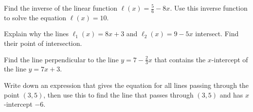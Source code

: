 \documentclass[11pt,letterpaper]{article}
\begin{document}

 Find the inverse of the linear function $\ell(x)= \frac{5}{6} - 8x$. Use this inverse function to solve the equation $\ell(x)= 10$. 



\newpage



 Explain why the lines $\ell_1(x)= 8x + 3$ and $\ell_2(x)= 9 - 5x$ intersect. Find their point of intersection. 



\newpage

 

 Find the line perpendicular to the line $y= 7 - \frac{2}{3}x$ that contains the $x$-intercept of the line $y= 7x + 3$. 



\newpage



 Write down an expression that gives the equation for all lines passing through the point $(3, 5)$, then use this to find the line that passes through $(3, 5)$ and has $x$-intercept $-6$. 
\end{document}
